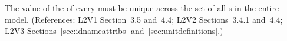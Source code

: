 The value of the   of every \UnitDefinition must be
unique across the set of all \UnitDefinition{}s in the entire
model.  (References: L2V1 Section~3.5 and~4.4; L2V2 Sections~3.4.1 and~4.4;
L2V3 Sections~\ref{sec:idnameattribs} and~\ref{sec:unitdefinitions}.)
